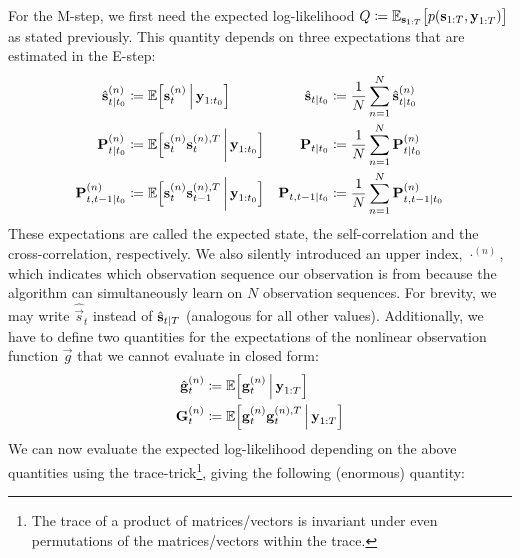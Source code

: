 	For the M-step, we first need the expected log-likelihood \( Q \coloneqq \mathbb{E}_{\boldsymbol{\mathrm{s}}_{1:T}}\big[ p(\boldsymbol{\mathrm{s}}_{1:T}, \boldsymbol{\mathrm{y}}_{1:T}) \big] \) as stated previously. This quantity depends on three expectations that are estimated in the E-step:
	\begin{align}
		\hat{\boldsymbol{\mathrm{s}}}_{t \vert t_0}^{(n)}  &\coloneqq \mathbb{E}\Big[\boldsymbol{\mathrm{s}}_t^{(n)} \,\Big\vert\, \boldsymbol{\mathrm{y}}_{1:t_0}\Big]                             & \hat{\boldsymbol{\mathrm{s}}}_{t \vert t_0}           & \coloneqq \frac{1}{N} \sum_{n = 1}^{N} \hat{\boldsymbol{\mathrm{s}}}_{t \vert t_0}^{(n)}  \label{eq:stateSmoothed} \\
		\boldsymbol{\mathrm{P}}_{t \vert t_0}^{(n)}        &\coloneqq \mathbb{E}\Big[\boldsymbol{\mathrm{s}}_t^{(n)} \boldsymbol{\mathrm{s}}_t^{(n), T} \,\bigg\vert\, \boldsymbol{\mathrm{y}}_{1:t_0}\Big]       & \boldsymbol{\mathrm{P}}_{t \vert t_0}        & \coloneqq \frac{1}{N} \sum_{n = 1}^{N} \boldsymbol{\mathrm{P}}_{t \vert t_0}^{(n)}  \label{eq:selfCorrelation} \\
		\boldsymbol{\mathrm{P}}_{t, t - 1 \vert t_0}^{(n)} &\coloneqq \mathbb{E}\Big[\boldsymbol{\mathrm{s}}_t^{(n)} \boldsymbol{\mathrm{s}}_{t - 1}^{(n), T} \,\bigg\vert\, \boldsymbol{\mathrm{y}}_{1:t_0}\Big] & \boldsymbol{\mathrm{P}}_{t, t - 1 \vert t_0} & \coloneqq \frac{1}{N} \sum_{n = 1}^{N} \boldsymbol{\mathrm{P}}_{t, t - 1 \vert t_0}^{(n)}  \label{eq:crossCorrelation}
	\end{align}
	These expectations are called the expected state, the self-correlation and the cross-correlation, respectively. We also silently introduced an upper index, \( \cdot^{(n)} \), which indicates which observation sequence our observation is from because the algorithm can simultaneously learn on \(N\) observation sequences. For brevity, we may write \( \hat{\vec{s}}_t \) instead of \( \hat{\boldsymbol{\mathrm{s}}}_{t \vert T} \) (analogous for all other values). Additionally, we have to define two quantities for the expectations of the nonlinear observation function \( \vec{g} \) that we cannot evaluate in closed form:
	\begin{align}
		\hat{\boldsymbol{\mathrm{g}}}_t^{(n)} &\coloneqq \mathbb{E}\Big[\boldsymbol{\mathrm{g}}_t^{(n)} \,\Big\vert\, \boldsymbol{\mathrm{y}}_{1:T}\Big]  \label{eq:expectedMeasurement} \\
		\boldsymbol{\mathrm{G}}_t^{(n)}       &\coloneqq \mathbb{E}\Big[\boldsymbol{\mathrm{g}}_t^{(n)} \boldsymbol{\mathrm{g}}_t^{(n), T} \,\Big\vert\, \boldsymbol{\mathrm{y}}_{1:T}\Big]  \label{eq:expectedMeasurementMat}
	\end{align}
	We can now evaluate the expected log-likelihood depending on the above quantities using the trace-trick\footnote{The trace of a product of matrices/vectors is invariant under even permutations of the matrices/vectors within the trace.}, giving the following (enormous) quantity:
